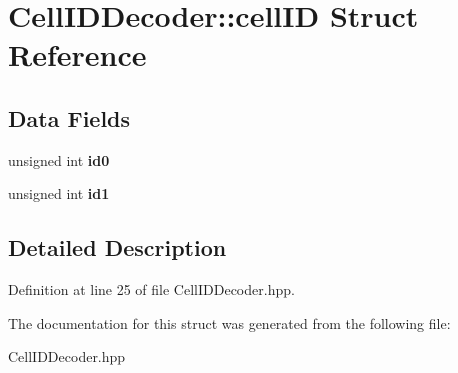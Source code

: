 \section{Cell\-I\-D\-Decoder\-:\-:cell\-I\-D Struct Reference}
\label{structCellIDDecoder_1_1cellID}
\subsection*{Data Fields}
\begin{DoxyCompactItemize}
\item 
unsigned int {\bfseries id0}\label{structCellIDDecoder_1_1cellID_a3ce25128462b7f1a02f793444d97b825}

\item 
unsigned int {\bfseries id1}\label{structCellIDDecoder_1_1cellID_a2b718a8f0cfc9b9eae6c87a23c2a9411}

\end{DoxyCompactItemize}


\subsection{Detailed Description}


Definition at line 25 of file Cell\-I\-D\-Decoder.\-hpp.



The documentation for this struct was generated from the following file\-:\begin{DoxyCompactItemize}
\item 
Cell\-I\-D\-Decoder.\-hpp\end{DoxyCompactItemize}
